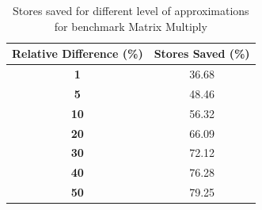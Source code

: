 \begin{table}[htbp]
\caption{Stores saved for different level of approximations for benchmark Matrix Multiply}
	\begin{center}
		\begin{tabular}{|c|c|}
			\hline

			\textbf{Relative Difference (\%)} & \textbf{Stores Saved (\%)}\\
			\hline

			\textbf{1} & 36.68\\
			\hline

			\textbf{5} & 48.46\\
			\hline

			\textbf{10} & 56.32\\
			\hline

			\textbf{20} & 66.09\\
			\hline

			\textbf{30} & 72.12\\
			\hline

			\textbf{40} & 76.28\\
			\hline

			\textbf{50} & 79.25\\
			\hline

		\end{tabular}
	\label{tab:matrix_multiply_reldiff}
	\end{center}
\end{table}




